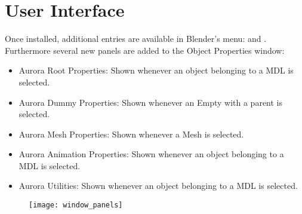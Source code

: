 \section{User Interface}
Once installed, additional entries are available in Blender's menu:  and 
. Furthermore several new panels are added to the Object Properties window:
\begin{itemize}
\item Aurora Root Properties: Shown whenever an object belonging to a MDL is selected.
\item Aurora Dummy Properties: Shown whenever an Empty with a parent is selected.
\item Aurora Mesh Properties: Shown whenever a Mesh is selected.
\item Aurora Animation Properties: Shown whenever an object belonging to a MDL is selected.
\item Aurora Utilities: Shown whenever an object belonging to a MDL is selected.
\end{itemize}

\begin{figure}[hb]
    \centering
    \texttt{[image: window\_panels]}
\end{figure}
